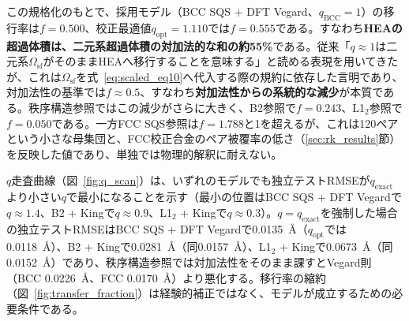 \documentclass[5p,10pt]{elsarticle}
\begin{document}
この規格化のもとで、採用モデル（BCC SQS + DFT Vegard、$q_\text{BCC} = 1$）の移行率は$f = 0.500$、校正最適値$q_\text{opt} = 1.110$では$f = 0.555$である。すなわち\textbf{HEAの超過体積は、二元系超過体積の対加法的な和の約55\%}である。従来「$q \approx 1$は二元系$\Omega_\text{sf}$がそのままHEAへ移行することを意味する」と読める表現を用いてきたが、これは$\Omega_\text{sf}$を式~\eqref{eq:scaled_eq10}へ代入する際の規約に依存した言明であり、対加法性の基準では$f \approx 0.5$、すなわち\textbf{対加法性からの系統的な減少}が本質である。秩序構造参照ではこの減少がさらに大きく、B2参照で$f = 0.243$、L1$_2$参照で$f = 0.050$である。一方FCC SQS参照は$f = 1.788$と1を超えるが、これは120ペアという小さな母集団と、FCC校正合金のペア被覆率の低さ（\ref{sec:rk_results}節）を反映した値であり、単独では物理的解釈に耐えない。

\begin{table}[!t]
\centering
\caption{移行率$f = q_s/q_\text{exact}$による校正定数の再規格化。$q_\text{opt}$は校正64 HEAで最適化した値、RMSEは独立テスト31 HEA（BCC 17、FCC 14）の該当構造に対する値。Vegard基準はBCC 0.0226~\AA、FCC 0.0170~\AA。}
\label{tab:transfer}
\end{table}

$q$走査曲線（図~\ref{fig:q_scan}）は、いずれのモデルでも独立テストRMSEが$q_\text{exact}$より小さい$q$で最小になることを示す（最小の位置はBCC SQS + DFT Vegardで$q \approx 1.4$、B2 + Kingで$q \approx 0.9$、L1$_2$ + Kingで$q \approx 0.3$）。$q = q_\text{exact}$を強制した場合の独立テストRMSEはBCC SQS + DFT Vegardで0.0135~\AA（$q_\text{opt}$では0.0118~\AA）、B2 + Kingで0.0281~\AA（同0.0157~\AA）、L1$_2$ + Kingで0.0673~\AA（同0.0152~\AA）であり、秩序構造参照では対加法性をそのまま課すとVegard則（BCC 0.0226~\AA、FCC 0.0170~\AA）より悪化する。移行率の縮約（図~\ref{fig:transfer_fraction}）は経験的補正ではなく、モデルが成立するための必要条件である。
\end{document}

